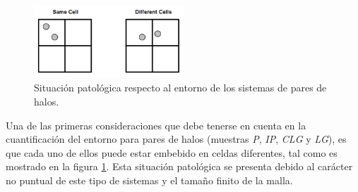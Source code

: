 	
\begin{figure}[htbp]
	\centering
	\includegraphics[width=0.5\textwidth]
	{./figures/4_results/Pathogenic_Situation.png}
	
	\caption{\small{Situación patológica respecto al entorno de los sistemas
	de pares de halos.}}
	\label{fig:Pathogenic_Situation}
\end{figure}


Una de las primeras consideraciones que debe tenerse en cuenta en la 
cuantificación del entorno para pares de halos (muestras \textit{P}, 
\textit{IP}, \textit{CLG} y \textit{LG}), es que cada uno de ellos puede 
estar embebido en celdas diferentes, tal como es mostrado en la figura 
\ref{fig:Pathogenic_Situation}. Esta situación patológica se presenta debido 
al carácter no puntual de este tipo de sistemas y el tamaño finito de la malla.

